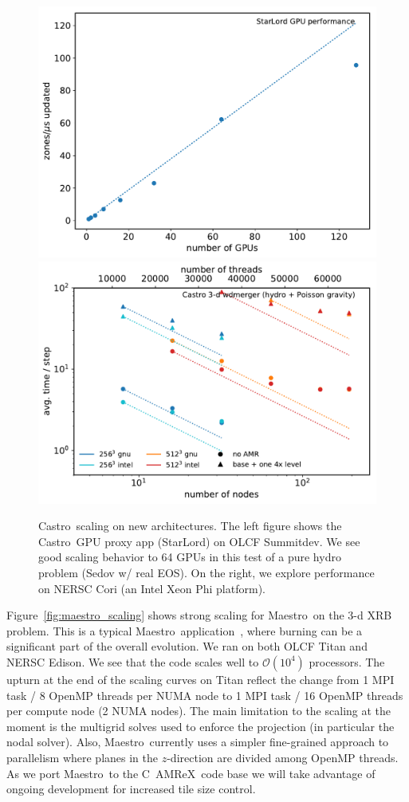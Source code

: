 \documentclass[a4paper]{jpconf}
\newcommand{\maestro}{{\sffamily Maestro}}
\newcommand{\castro}{{\sffamily Castro}}
\newcommand{\starlord}{{\sffamily StarLord}}
\newcommand{\amrex}{{\sffamily AMReX}}
\newcommand{\cpp}{C\nolinebreak\hspace{-.05em}\raisebox{.4ex}{\tiny\bf +}\nolinebreak\hspace{-.10em}\raisebox{.4ex}{\tiny\bf +}}
\begin{document}
\begin{figure}[t]
\centering
\includegraphics[width=0.48\linewidth]{summitdev_scaling}
\includegraphics[width=0.48\linewidth]{cori_scaling}
\caption{\label{fig:knl-gpu-scaling} \castro\ scaling on new
  architectures.  The left figure shows the \castro\ GPU proxy app
  (\starlord) on OLCF Summitdev.  We see good scaling behavior to 64
  GPUs in this test of a pure hydro problem (Sedov w/ real EOS).  On the
right, we explore performance on NERSC Cori (an Intel Xeon Phi platform).}
\end{figure}

Figure~\ref{fig:maestro_scaling} shows strong scaling for \maestro\ on
the 3-d XRB problem.  This is a typical
\maestro\ application~\cite{xrb3}, where burning can be a significant
part of the overall evolution.  We ran on both OLCF Titan and NERSC
Edison.  We see that the code scales well to $\mathcal{O}(10^4)$
processors.  The upturn at the end of the scaling curves on Titan
reflect the change from 1 MPI task / 8 OpenMP threads per NUMA node to
1 MPI task / 16 OpenMP threads per compute node (2 NUMA nodes).  The
main limitation to the scaling at the moment is the multigrid solves
used to enforce the projection (in particular the nodal solver).
Also, \maestro\ currently uses a simpler fine-grained approach to parallelism
where planes in the $z$-direction are divided among OpenMP threads.
As we port \maestro\ to the \cpp\ \amrex\ code base we will take
advantage of ongoing development for increased tile size control.
\end{document}
